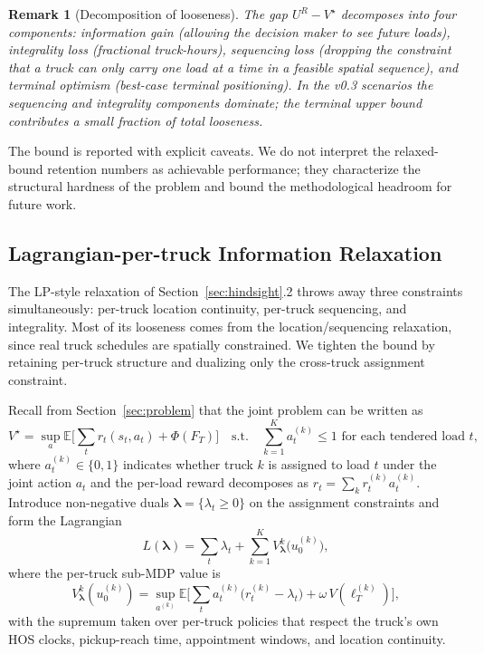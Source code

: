 \documentclass[11pt]{article}
\newtheorem{remark}{Remark}
\begin{document}
\begin{remark}[Decomposition of looseness]
The gap $U^R - V^\star$ decomposes into four components: information gain
(allowing the decision maker to see future loads), integrality loss
(fractional truck-hours), sequencing loss (dropping the constraint that a
truck can only carry one load at a time in a feasible spatial sequence),
and terminal optimism (best-case terminal positioning). In the v0.3
scenarios the sequencing and integrality components dominate; the
terminal upper bound contributes a small fraction of total looseness.
\end{remark}

The bound is reported with explicit caveats. We do not interpret the
relaxed-bound retention numbers as achievable performance; they
characterize the structural hardness of the problem and bound the
methodological headroom for future work.

\subsection{Lagrangian-per-truck Information Relaxation}
\label{subsec:lagrangian}

The LP-style relaxation of Section~\ref{sec:hindsight}.2 throws away
three constraints simultaneously: per-truck location continuity,
per-truck sequencing, and integrality. Most of its looseness comes from
the location/sequencing relaxation, since real truck schedules are
spatially constrained. We tighten the bound by retaining per-truck
structure and dualizing only the cross-truck assignment constraint.

Recall from Section~\ref{sec:problem} that the joint problem can be
written as
\begin{equation}
  V^\star = \sup_{a} \mathbb{E}\Biggl[ \sum_t r_t(s_t, a_t) + \Phi(F_T) \Biggr]
  \quad \text{s.t.} \quad
  \sum_{k=1}^{K} a^{(k)}_t \leq 1 \text{ for each tendered load } t,
\end{equation}
where $a^{(k)}_t \in \{0, 1\}$ indicates whether truck $k$ is assigned
to load $t$ under the joint action $a_t$ and the per-load reward
decomposes as $r_t = \sum_k r^{(k)}_t a^{(k)}_t$. Introduce non-negative
duals $\boldsymbol{\lambda} = \{\lambda_t \geq 0\}$ on the assignment
constraints and form the Lagrangian
\begin{equation}
  L(\boldsymbol{\lambda})
  = \sum_t \lambda_t + \sum_{k=1}^{K} V^k_{\boldsymbol{\lambda}}\!\bigl(u^{(k)}_0\bigr),
  \label{eq:lagrangian}
\end{equation}
where the per-truck sub-MDP value is
\begin{equation}
  V^k_{\boldsymbol{\lambda}}(u^{(k)}_0) =
  \sup_{a^{(k)}} \mathbb{E}\Biggl[
    \sum_t a^{(k)}_t\bigl(r^{(k)}_t - \lambda_t\bigr)
    + \omega \, V(\ell^{(k)}_T)
  \Biggr],
\end{equation}
with the supremum taken over per-truck policies that respect the
truck's own HOS clocks, pickup-reach time, appointment windows, and
location continuity.
\end{document}

